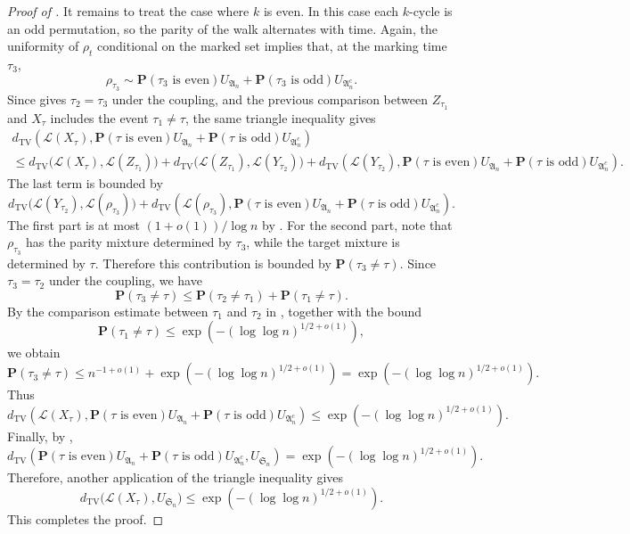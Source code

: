 \begin{proof}[Proof of ]
It remains to treat the case where \(k\) is even. In this case each \(k\)-cycle is an odd permutation, so the parity of the walk alternates with time. Again, the uniformity of \(\rho_t\) conditional on the marked set implies that, at the marking time \(\tau_3\),
$$
\rho_{\tau_3}
\sim
\mathbf P(\tau_3\text{ is even})U_{\mathfrak A_n}
+
\mathbf P(\tau_3\text{ is odd})U_{\mathfrak A_n^c}.
$$
Since  gives \(\tau_2=\tau_3\) under the coupling, and the previous comparison between \(Z_{\tau_1}\) and \(X_\tau\) includes the event \(\tau_1\neq \tau\), the same triangle inequality gives
\begin{multline}
d_{\mathrm{TV}}\left(
\mathcal L(X_\tau),
\mathbf P(\tau\text{ is even})U_{\mathfrak A_n}+
\mathbf P(\tau\text{ is odd})U_{\mathfrak A_n^c}
\right) \\\leq d_{\mathrm{TV}}\bigl(\mathcal L(X_\tau),\mathcal L(Z_{\tau_1})\bigr)
+d_{\mathrm{TV}}\bigl(\mathcal L(Z_{\tau_1}),\mathcal L(Y_{\tau_2})\bigr)
+d_{\mathrm{TV}}\left(\mathcal L(Y_{\tau_2}),
\mathbf P(\tau\text{ is even})U_{\mathfrak A_n}+\mathbf P(\tau\text{ is odd})U_{\mathfrak A_n^c}
\right).
\end{multline}
The last term is bounded by
$$
d_{\mathrm{TV}}\bigl(\mathcal L(Y_{\tau_2}),\mathcal L(\rho_{\tau_3})\bigr)
+
d_{\mathrm{TV}}\left(
\mathcal L(\rho_{\tau_3}),
\mathbf P(\tau\text{ is even})U_{\mathfrak A_n}
+
\mathbf P(\tau\text{ is odd})U_{\mathfrak A_n^c}
\right).
$$
The first part is at most \((1+o(1))/\log n\) by . For the second part, note that \(\rho_{\tau_3}\) has the parity mixture determined by \(\tau_3\), while the target mixture is determined by \(\tau\). Therefore this contribution is bounded by $\mathbf P(\tau_3\neq \tau)$. Since $\tau_3=\tau_2$ under the coupling, we have
$$
\mathbf P(\tau_3\neq \tau)\leq\mathbf P(\tau_2\neq \tau_1)+\mathbf P(\tau_1\neq \tau).
$$
By the comparison estimate between $\tau_1$ and $\tau_2$ in , together
with the bound
$$
\mathbf P(\tau_1\neq \tau)\leq\exp\left(-(\log\log n)^{1/2+o(1)}\right),
$$
we obtain
$$
\mathbf P(\tau_3\neq \tau)\leq n^{-1+o(1)}+\exp\left(-(\log\log n)^{1/2+o(1)}\right)=\exp\left(-(\log\log n)^{1/2+o(1)}\right).
$$
Thus
$$
d_{\mathrm{TV}}\left(
\mathcal L(X_\tau),
\mathbf P(\tau\text{ is even})U_{\mathfrak A_n}
+
\mathbf P(\tau\text{ is odd})U_{\mathfrak A_n^c}
\right)
\leq
\exp\left(-(\log\log n)^{1/2+o(1)}\right).
$$
Finally, by ,
$$
d_{\mathrm{TV}}\left(
\mathbf P(\tau\text{ is even})U_{\mathfrak A_n}+\mathbf P(\tau\text{ is odd})U_{\mathfrak A_n^c},
U_{\mathfrak S_n}
\right)=\exp\left(-(\log\log n)^{1/2+o(1)}\right).
$$
Therefore, another application of the triangle inequality gives
$$
d_{\mathrm{TV}}\bigl(\mathcal L(X_\tau),U_{\mathfrak S_n}\bigr)
\leq
\exp\left(-(\log\log n)^{1/2+o(1)}\right).
$$
This completes the proof.
\end{proof}



